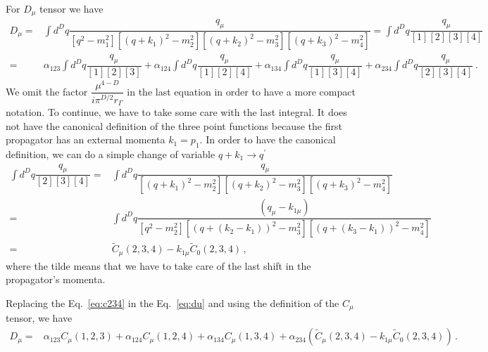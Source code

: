 For $D_{\mu}$ tensor we have
%
\begin{align}
\label{eq:du}
D_{\mu} = &\int d^Dq \dfrac{ q_{\mu} }{[q^2-m_1^2][(q+k_1)^2-m_2^2][(q+k_2)^2-m_3^2][(q+k_3)^2-m_4^2]}
=\int d^Dq \dfrac{ q_{\mu} }{[1][2][3][4]} \nonumber \\
=&\alpha_{123}\int d^Dq \dfrac{ q_{\mu} }{[1][2][3]} 
+\alpha_{124}\int d^Dq \dfrac{ q_{\mu} }{[1][2][4]} 
+\alpha_{134}\int d^Dq \dfrac{ q_{\mu} }{[1][3][4]} 
+\alpha_{234}\int d^Dq \dfrac{ q_{\mu} }{[2][3][4]}\,. 
\end{align} 
%
We omit the factor $\dfrac{\mu^{4-D}}{i\pi^{D/2}r_{\Gamma}}$ in the last equation in order to have a more compact notation. To continue, we have to take some care with the last integral. It does not have the canonical definition of the three point functions because the first propagator has an external momenta $k_1=p_1$. In order to have the canonical definition, we can do a simple change of variable $q+k_1\rightarrow q^{'}$ 
\begin{align}
\label{eq:c234}
\int d^Dq \dfrac{ q_{\mu} }{[2][3][4]}=&\int d^Dq \dfrac{ q_{\mu} }{[(q+k_1)^2-m_2^2][(q+k_2)^2-m_3^2][(q+k_3)^2-m_4^2]}\nonumber \\
=& \int d^Dq \dfrac{ (q_{\mu}-k_{1\mu}) }{[q^2-m_2^2][(q+(k_2-k_1))^2-m_3^2][(q+(k_3-k_1))^2-m_4^2]}\nonumber \\
=& \tilde{C}_{\mu}(2,3,4)-k_{1\mu}\tilde{C}_0(2,3,4)\,,
\end{align}
where the tilde means that we have to take care of the last shift in the propagator's momenta.

Replacing the Eq.~\eqref{eq:c234} in the Eq.~\eqref{eq:du} and using the definition of the $C_{\mu}$ tensor, we have
%
\begin{align}
D_{\mu}=& \alpha_{123}C_{\mu}(1,2,3)+\alpha_{124}C_{\mu}(1,2,4)+\alpha_{134}C_{\mu}(1,3,4) +\alpha_{234}\left(\tilde{C}_{\mu}(2,3,4)-k_{1\mu}\tilde{C}_0(2,3,4)\right)\,.
\end{align} 

